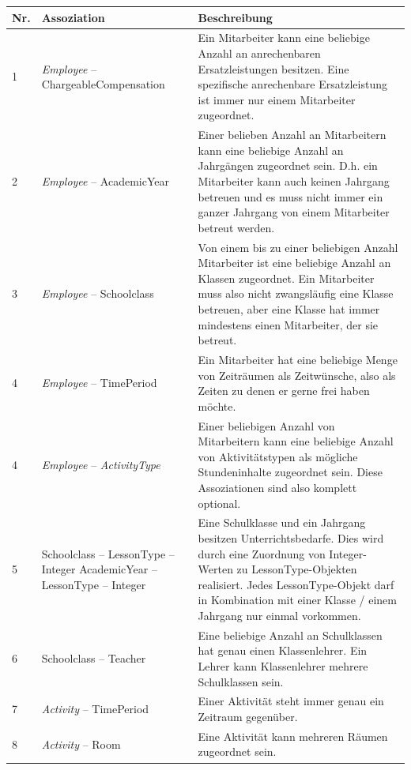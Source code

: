 \documentclass[fontsize=12pt,paper=a4,twoside]{scrartcl}
\begin{document}
\begin{tabularx}{\textwidth}{|p{0.6cm}|p{5cm}|X|}
\hline
\textbf{Nr.} & \textbf{Assoziation} & \textbf{Beschreibung} \\\hline
1 	& \textit{Employee} -- ChargeableCompensation	& Ein Mitarbeiter kann eine beliebige Anzahl
	an anrechenbaren Ersatzleistungen besitzen. Eine spezifische anrechenbare Ersatzleistung ist immer nur einem Mitarbeiter zugeordnet. \\\hline
2	& \textit{Employee} -- AcademicYear 	& Einer belieben Anzahl an Mitarbeitern kann eine 
	beliebige Anzahl an Jahrgängen zugeordnet sein. D.h. ein Mitarbeiter kann auch keinen Jahrgang betreuen und es muss nicht immer ein ganzer Jahrgang von einem Mitarbeiter betreut werden. \\\hline
3	& \textit{Employee} -- Schoolclass		& Von einem bis zu einer beliebigen Anzahl Mitarbeiter 
	ist eine beliebige Anzahl an Klassen zugeordnet. Ein Mitarbeiter muss also nicht zwangsläufig eine Klasse betreuen, aber eine Klasse hat immer mindestens einen Mitarbeiter, der sie betreut.\\\hline
4	& \textit{Employee} -- TimePeriod		& Ein Mitarbeiter hat eine beliebige Menge von 
	Zeiträumen als Zeitwünsche, also als Zeiten zu denen er gerne frei haben möchte. \\\hline
4	& \textit{Employee} -- \textit{ActivityType} & Einer beliebigen Anzahl von Mitarbeitern kann
	eine beliebige Anzahl von Aktivitätstypen als mögliche Stundeninhalte zugeordnet sein. Diese Assoziationen sind also komplett optional. \\\hline
5	& Schoolclass -- LessonType -- Integer \newline
	  AcademicYear -- LessonType -- Integer				& Eine Schulklasse und ein Jahrgang besitzen Unterrichtsbedarfe. Dies wird durch eine Zuordnung von Integer-Werten zu LessonType-Objekten realisiert. Jedes LessonType-Objekt darf in Kombination mit einer Klasse / einem Jahrgang nur einmal vorkommen. \\\hline
6	& Schoolclass -- Teacher 				& Eine beliebige Anzahl an Schulklassen hat genau
	einen Klassenlehrer. Ein Lehrer kann Klassenlehrer mehrere Schulklassen sein. \\\hline
7	& \textit{Activity} -- TimePeriod				& Einer Aktivität steht immer genau ein
	Zeitraum gegenüber.\\\hline
8	& \textit{Activity} -- Room						& Eine Aktivität kann mehreren Räumen
	zugeordnet
	sein.\\\hline
\end{tabularx}
\end{document}
